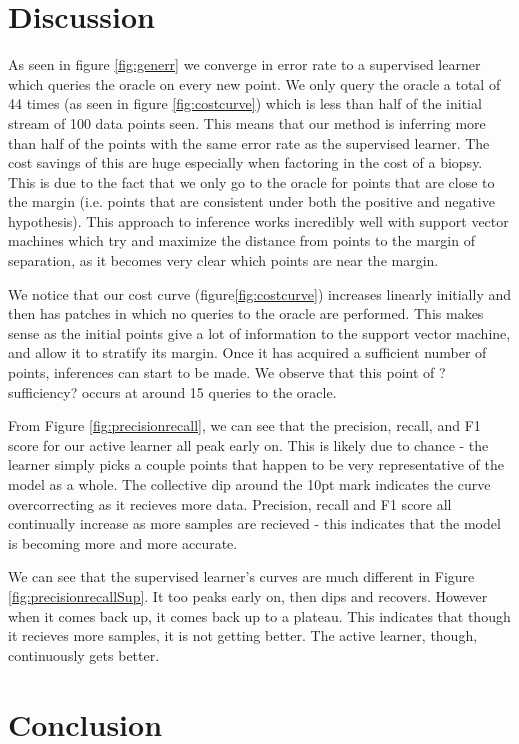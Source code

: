 \documentclass[12pt]{article}
\begin{document}
\section{Discussion}
As seen in figure \ref{fig:generr} we converge in error rate to a supervised learner which queries the oracle on every new point. We only query the oracle a total of 44 times (as seen in figure \ref{fig:costcurve}) which is less than half of the initial stream of 100 data points seen. This means that our method is inferring more than half of the points with the same error rate as the supervised learner. The cost savings of this are huge especially when factoring in the cost of a biopsy. This is due to the fact that we only go to the oracle for points that are close to the margin (i.e. points that are consistent under both the positive and negative hypothesis). This approach to inference works incredibly well with support vector machines which try and maximize the distance from points to the margin of separation, as it becomes very clear which points are near the margin.

We notice that our cost curve (figure\ref{fig:costcurve}) increases linearly initially and then has patches in which no queries to the oracle are performed. This makes sense as the initial points give a lot of information to the support vector machine, and allow it to stratify its margin. Once it has acquired a sufficient number of points, inferences can start to be made. We observe that this point of ?sufficiency? occurs at around 15 queries to the oracle.

From Figure \ref{fig:precisionrecall}, we can see that the precision, recall, and F1 score for our active learner all peak early on. This is likely due to chance - the learner simply picks a couple points that happen to be very representative of the model as a whole. The collective dip around the 10pt mark indicates the curve overcorrecting as it recieves more data. Precision, recall and F1 score all continually increase as more samples are recieved - this indicates that the model is becoming more and more accurate.

We can see that the supervised learner's curves are much different in Figure \ref{fig:precisionrecallSup}. It too peaks early on, then dips and recovers. However when it comes back up, it comes back up to a plateau. This indicates that though it recieves more samples, it is not getting better. The active learner, though, continuously gets better.

\section{Conclusion}
\end{document}
